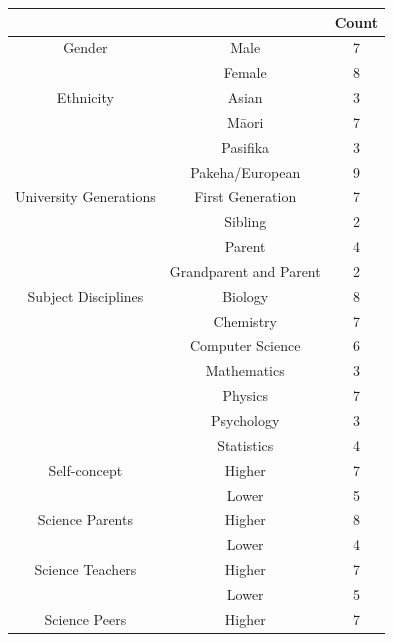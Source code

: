 \begin{table}[ht]
\begin{tabular}{cc|c}
                       &                        & Count \\ \hline
Gender                 & Male                   & 7     \\
                       & Female                 & 8     \\ \hline
Ethnicity              & Asian                  & 3     \\
                       & M\={a}ori                  & 7     \\
                       & Pasifika               & 3     \\
                       & Pakeha/European        & 9     \\ \hline
University Generations & First Generation       & 7     \\
                       & Sibling                & 2     \\
                       & Parent                 & 4     \\
                       & Grandparent and Parent & 2     \\ \hline
Subject Disciplines    & Biology                & 8     \\
                       & Chemistry              & 7     \\
                       & Computer Science       & 6     \\
                       & Mathematics            & 3     \\
                       & Physics                & 7     \\
                       & Psychology             & 3     \\
                       & Statistics             & 4     \\ \hline
Self-concept          & Higher                   & 7     \\
                       & Lower                    & 5     \\ \hline
Science Parents        & Higher                   & 8     \\
                       & Lower                    & 4     \\ \hline
Science Teachers       & Higher                   & 7     \\
                       & Lower                    & 5     \\ \hline
Science Peers          & Higher                   & 7     \\

\end{tabular}
\end{table}
